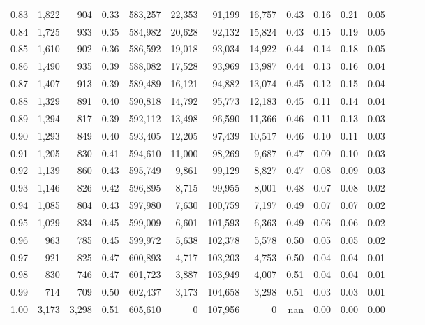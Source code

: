 \begin{tabular}{rrrrrrrrrrrrrrr}
0.83 &   1,822 &    904 &  0.33 &  583,257 &   22,353 &   91,199 &   16,757 &  0.43 &  0.16 &  0.21 &      0.05 \\
0.84 &   1,725 &    933 &  0.35 &  584,982 &   20,628 &   92,132 &   15,824 &  0.43 &  0.15 &  0.19 &      0.05 \\
0.85 &   1,610 &    902 &  0.36 &  586,592 &   19,018 &   93,034 &   14,922 &  0.44 &  0.14 &  0.18 &      0.05 \\
0.86 &   1,490 &    935 &  0.39 &  588,082 &   17,528 &   93,969 &   13,987 &  0.44 &  0.13 &  0.16 &      0.04 \\
0.87 &   1,407 &    913 &  0.39 &  589,489 &   16,121 &   94,882 &   13,074 &  0.45 &  0.12 &  0.15 &      0.04 \\
0.88 &   1,329 &    891 &  0.40 &  590,818 &   14,792 &   95,773 &   12,183 &  0.45 &  0.11 &  0.14 &      0.04 \\
0.89 &   1,294 &    817 &  0.39 &  592,112 &   13,498 &   96,590 &   11,366 &  0.46 &  0.11 &  0.13 &      0.03 \\
0.90 &   1,293 &    849 &  0.40 &  593,405 &   12,205 &   97,439 &   10,517 &  0.46 &  0.10 &  0.11 &      0.03 \\
0.91 &   1,205 &    830 &  0.41 &  594,610 &   11,000 &   98,269 &    9,687 &  0.47 &  0.09 &  0.10 &      0.03 \\
0.92 &   1,139 &    860 &  0.43 &  595,749 &    9,861 &   99,129 &    8,827 &  0.47 &  0.08 &  0.09 &      0.03 \\
0.93 &   1,146 &    826 &  0.42 &  596,895 &    8,715 &   99,955 &    8,001 &  0.48 &  0.07 &  0.08 &      0.02 \\
0.94 &   1,085 &    804 &  0.43 &  597,980 &    7,630 &  100,759 &    7,197 &  0.49 &  0.07 &  0.07 &      0.02 \\
0.95 &   1,029 &    834 &  0.45 &  599,009 &    6,601 &  101,593 &    6,363 &  0.49 &  0.06 &  0.06 &      0.02 \\
0.96 &     963 &    785 &  0.45 &  599,972 &    5,638 &  102,378 &    5,578 &  0.50 &  0.05 &  0.05 &      0.02 \\
0.97 &     921 &    825 &  0.47 &  600,893 &    4,717 &  103,203 &    4,753 &  0.50 &  0.04 &  0.04 &      0.01 \\
0.98 &     830 &    746 &  0.47 &  601,723 &    3,887 &  103,949 &    4,007 &  0.51 &  0.04 &  0.04 &      0.01 \\
0.99 &     714 &    709 &  0.50 &  602,437 &    3,173 &  104,658 &    3,298 &  0.51 &  0.03 &  0.03 &      0.01 \\
1.00 &   3,173 &  3,298 &  0.51 &  605,610 &        0 &  107,956 &        0 &   nan &  0.00 &  0.00 &      0.00 \\
\bottomrule
\end{tabular}
